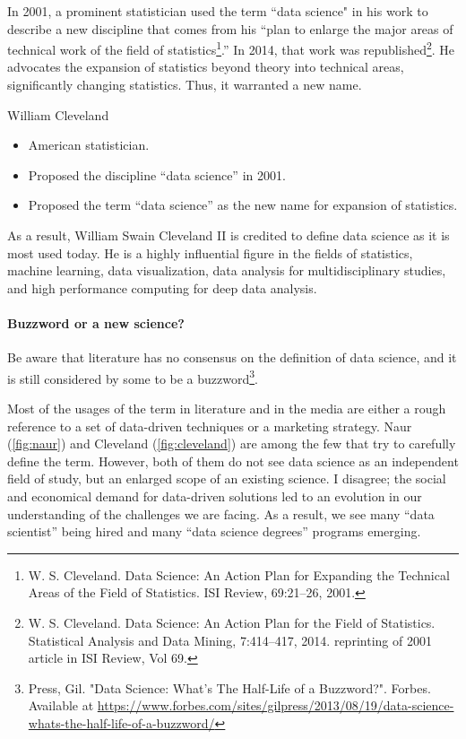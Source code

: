 In 2001, a prominent statistician used the term ``data science" in his work to describe a
new discipline that comes from his ``plan to enlarge the major areas of technical work of
the field of statistics\footnote{W. S. Cleveland. Data Science: An Action Plan for
Expanding the Technical Areas of the Field of Statistics. ISI Review, 69:21–26, 2001.}.''
In 2014, that work was republished\footnote{W. S. Cleveland.
Data Science: An Action Plan for the Field of Statistics. Statistical Analysis and Data
Mining, 7:414–417, 2014. reprinting of 2001 article in ISI Review, Vol 69.}.
He advocates the expansion of statistics beyond theory into technical areas, significantly
changing statistics.  Thus, it warranted a new name.

\begin{slidebox}{William Cleveland}{}
  \begin{itemize}
    \item American statistician.
    \item Proposed the discipline ``data science'' in 2001.
    \item Proposed the term ``data science'' as the new name for expansion of statistics.
  \end{itemize}
\end{slidebox}

As a result, William Swain Cleveland II is credited to define data science as it is most
used today. He is a highly influential figure in the fields of statistics, machine
learning, data visualization, data analysis for multidisciplinary studies, and high
performance computing for deep data analysis.

\paragraph{Buzzword or a new science?}

Be aware that literature has no consensus on the definition of data science, and it is still considered
by some to be a buzzword\footnote{Press, Gil. "Data Science: What's The Half-Life of a
Buzzword?". Forbes. Available at
\url{https://www.forbes.com/sites/gilpress/2013/08/19/data-science-whats-the-half-life-of-a-buzzword/}}.

Most of the usages of the term in literature and in the media are either a rough
reference to a set of data-driven techniques or a marketing strategy.  Naur
(\cref{fig:naur}) and Cleveland (\cref{fig:cleveland}) are among the few that try to
carefully define the term.  However, both of them do not see data science as an
independent field of study, but an enlarged scope of an existing science.  I disagree;
the social and economical demand for data-driven solutions led to an evolution in our
understanding of the challenges we are facing.  As a result, we see many ``data
scientist'' being hired and many ``data science degrees'' programs emerging.

